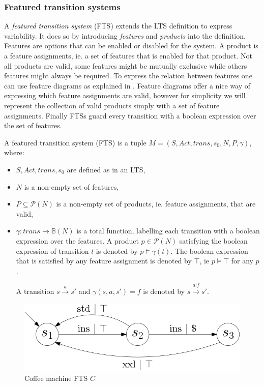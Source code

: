 \subsubsection{Featured transition systems}
A \textit{featured transition system} (FTS) extends the LTS definition to express variability. It does so by introducing \textit{features} and \textit{products} into the definition. Features are options that can be enabled or disabled for the system. A product is a feature assignments, ie. a set of features that is enabled for that product. Not all products are valid, some features might be mutually exclusive while others features might always be required. To express the relation between features one can use feature diagrams as explained in \cite{Classen2013FeaturedTS}. Feature diagrams offer a nice way of expressing which feature assignments are valid, however for simplicity we will represent the collection of valid products simply with a set of feature assignments. Finally FTSs guard every transition with a boolean expression over the set of features.
\begin{definition}
	\label{def_fts}\cite{Classen2013FeaturedTS} A featured transition system (FTS) is a tuple $M = (S, Act, trans, s_0, N, P, \gamma)$, where:
	\begin{itemize}
		\item $S, Act, trans, s_0$ are defined as in an LTS,
		\item $N$ is a non-empty set of features,
		\item $P \subseteq \mathcal{P}(N)$ is a non-empty set of products, ie. feature assignments, that are valid,
		\item $\gamma : trans \rightarrow \mathbb{B}(N)$ is a total function, labelling each transition with a boolean expression over the features. A product $p \in \mathcal{P}(N)$ satisfying the boolean expression of transition $t$ is denoted by $p \models \gamma(t)$. The boolean expression that is satisfied by any feature assignment is denoted by $\top$, ie $p \models \top$ for any $p$.
		
		A transition $s \xrightarrow a s'$ and $\gamma(s,a,s') = f$ is denoted by $s \xrightarrow {a | f} s'$. 
	\end{itemize}
\end{definition}
\begin{figure}[h]
\centering
\includegraphics[scale=0.3]{Examples/CoffeeMachine/FTS}
\caption[Coffee machine LTS]{Coffee machine FTS $C$}
\label{fig:coffeemachinefts}
\end{figure}

